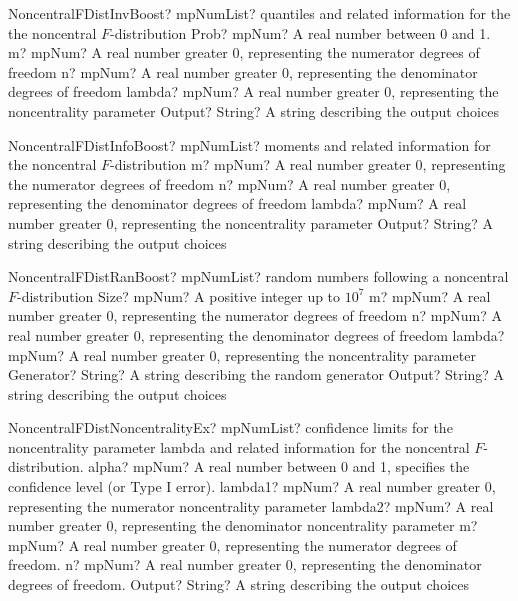 \documentclass[12pt,a4paper,openany]{book}
\begin{document}
\begin{mpFunctionsExtract}
\mpFunctionFiveNotImplemented
{NoncentralFDistInvBoost? mpNumList? quantiles and related information for the the noncentral $F$-distribution}
{Prob? mpNum? A real number between 0 and 1.}
{m? mpNum? A real number greater 0, representing the numerator  degrees of freedom}
{n? mpNum? A real number greater 0, representing the denominator degrees of freedom}
{lambda? mpNum? A real number greater 0, representing the noncentrality parameter}
{Output? String? A string describing the output choices}
\end{mpFunctionsExtract}

\begin{mpFunctionsExtract}
\mpFunctionFourNotImplemented
{NoncentralFDistInfoBoost? mpNumList?  moments and related information for the noncentral $F$-distribution}
{m? mpNum? A real number greater 0, representing the numerator  degrees of freedom}
{n? mpNum? A real number greater 0, representing the denominator degrees of freedom}
{lambda? mpNum? A real number greater 0, representing the noncentrality parameter}
{Output? String? A string describing the output choices}
\end{mpFunctionsExtract}

\begin{mpFunctionsExtract}
\mpFunctionSixNotImplemented
{NoncentralFDistRanBoost? mpNumList? random numbers following a noncentral $F$-distribution}
{Size? mpNum? A positive integer up to $10^7$}
{m? mpNum? A real number greater 0, representing the numerator  degrees of freedom}
{n? mpNum? A real number greater 0, representing the denominator degrees of freedom}
{lambda? mpNum? A real number greater 0, representing the noncentrality parameter}
{Generator? String? A string describing the random generator}
{Output? String? A string describing the output choices}
\end{mpFunctionsExtract}

\begin{mpFunctionsExtract}
\mpFunctionSixNotImplemented
{NoncentralFDistNoncentralityEx? mpNumList? confidence limits for the noncentrality parameter lambda and related information for the noncentral $F$-distribution.}
{alpha? mpNum? A real number between 0 and 1, specifies the confidence level (or Type I error).}
{lambda1? mpNum? A real number greater 0, representing the numerator noncentrality parameter}
{lambda2? mpNum? A real number greater 0, representing the denominator noncentrality parameter}
{m? mpNum? A real number greater 0, representing the numerator  degrees of freedom.}
{n? mpNum? A real number greater 0, representing the denominator degrees of freedom.}
{Output? String? A string describing the output choices}
\end{mpFunctionsExtract}
\end{document}
